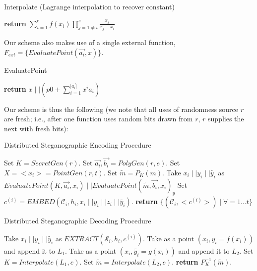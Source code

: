 \documentclass{article}
\begin{document}
\begin{algorithm}[H]
\caption{Interpolate (Lagrange interpolation to recover constant) }\label{1a}
\begin{algorithmic}[1]
\State \textbf{return} $\sum_{i=1}^{e} f(x_i) \prod_{j=1\neq i}^{e} \frac{x_j}{x_j - x_i}$
\EndProcedure
\end{algorithmic}
\end{algorithm}

\noindent Our scheme also makes use of a single external function, $F_{ext} = \{ EvaluatePoint(\vec{a_i}, x) \}$.

\begin{algorithm}[H]
\caption{EvaluatePoint}\label{1a}
\begin{algorithmic}[1]
\State \textbf{return} $x \mid \mid (p0 + \sum_{i=1}^{\lvert \vec{a_i} \rvert} x^i a_i)$
\EndProcedure
\end{algorithmic}
\end{algorithm}

\noindent Our scheme is thus the following (we note that all uses of randomness source $r$ are fresh; i.e., after one function 
uses random bits drawn from $r$, $r$ supplies the next with fresh bits):

\begin{algorithm}[H]
\caption{Distributed Steganographic Encoding Procedure}\label{1a}
\begin{algorithmic}[1]
\State Set $K = SecretGen(r)$.
\State Set $\vec{a_i}, \vec{b_i} = PolyGen(r,e)$.
\State Set $X = <x_i> = PointGen(r,t)$.
\State Set $\tilde{m} = P_K(m)$.
\State Take $x_i \mid \mid y_i \mid \mid \tilde{y_i}$ as $EvaluatePoint(K, \vec{a_i}, x_i) \mid \mid EvaluatePoint(\tilde{m}, \vec{b_i}, x_i)_y$
\State Set $c^{(i)} = EMBED(\mathcal{C}_i, h_i, x_i \mid \mid y_i \mid \mid z_i \mid \mid \tilde{y_i})$.
\EndFor
\State \textbf{return} $\{(\mathcal{C}_i, <c^{(i)}>) \mid \forall =1...t \}$
\EndProcedure
\end{algorithmic}
\end{algorithm}


\begin{algorithm}[H]
\caption{Distributed Steganographic Decoding Procedure}\label{1a}
\begin{algorithmic}[1]
\State Take $x_i \mid \mid y_i \mid \mid \tilde{y_i}$ as $EXTRACT(\mathcal{S}_i, h_i, c^{(i)})$.
\State Take as a point $(x_i, y_i = f(x_i))$ and append it to $L_1$.
\State Take as a point $(x_i, \tilde{y_i} = g(x_i))$ and append it to $L_2$.
\EndFor
\State Set $K = Interpolate(L_1,e)$.
\State Set $\tilde{m} = Interpolate(L_2, e)$.
\State \textbf{return} $P_K^{-1}(\tilde{m})$.
\EndProcedure
\end{algorithmic}
\end{algorithm}
\end{document}
